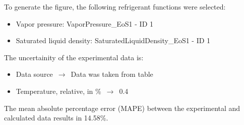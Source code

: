 To generate the figure, the following refrigerant functions were selected:
\begin{itemize}
\item Vapor pressure: VaporPressure\_EoS1 - ID 1
\item Saturated liquid density: SaturatedLiquidDensity\_EoS1 - ID 1
\end{itemize}

The uncertainity of the experimental data is:
\begin{itemize}
\item Data source $\,\to\,$ Data was taken from table
\item Temperature, relative, in \% $\,\to\,$ 0.4
\end{itemize}

The mean absolute percentage error (MAPE) between the experimental and calculated data results in 14.58\%.
\FloatBarrier
\newpage
